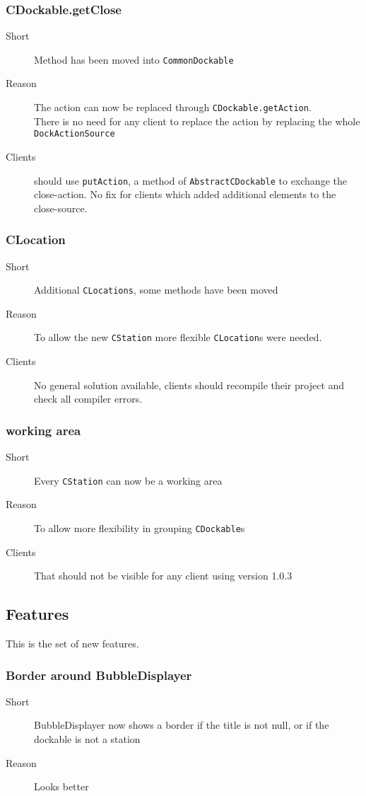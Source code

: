 \documentclass[a4paper,10pt]{article}
\newcommand{\src}[1]{\lstinline[basicstyle=\normalsize\ttfamily,keywordstyle=\normalsize\ttfamily,identifierstyle=\normalsize\ttfamily]|#1|}
\newcommand{\short}{\item[Short]}
\newcommand{\why}{\item[Reason]}
\newcommand{\clients}{\item[Clients]}
\begin{document}
\subsubsection{CDockable.getClose}
\begin{description}
\short Method has been moved into \src{CommonDockable}
\why The action can now be replaced through \src{CDockable.getAction}.\\There is no need for any client to replace the action by replacing the whole \src{DockActionSource}
\clients should use \src{putAction}, a method of \src{AbstractCDockable} to exchange the close-action. No fix for clients which added additional elements to the close-source.
\end{description}

\subsubsection{CLocation}
\begin{description}
\short Additional \src{CLocations}, some methods have been moved
\why To allow the new \src{CStation} more flexible \src{CLocation}s were needed.
\clients No general solution available, clients should recompile their project and check all compiler errors.
\end{description}

\subsubsection{working area}
\begin{description}
\short Every \src{CStation} can now be a working area
\why To allow more flexibility in grouping \src{CDockable}s
\clients That should not be visible for any client using version 1.0.3
\end{description}


\subsection{Features}
This is the set of new features.

\subsubsection{Border around BubbleDisplayer}
\begin{description}
 \short BubbleDisplayer now shows a border if the title is not null, or if the dockable is not a station
 \why Looks better
\end{description}
\end{document}
